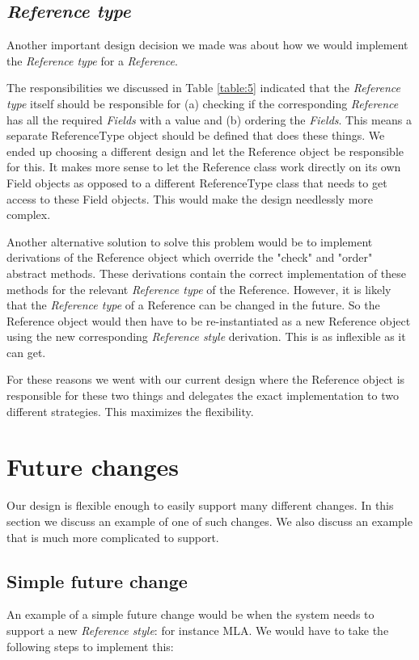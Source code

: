 \documentclass[a4paper]{article}
\begin{document}
\subsection{\textit{Reference type}}
Another important design decision we made was about how we would implement the \textit{Reference type} for a \textit{Reference}. 

The responsibilities we discussed in Table \ref{table:5} indicated that the \textit{Reference type} itself should be responsible for (a) checking if the corresponding \textit{Reference} has all the required \textit{Fields} with a value and (b) ordering the \textit{Fields}. This means a separate ReferenceType object should be defined that does these things. We ended up choosing a different design and let the Reference object be responsible for this. It makes more sense to let the Reference class work directly on its own Field objects as opposed to a different ReferenceType class that needs to get access to these Field objects. This would make the design needlessly more complex.

Another alternative solution to solve this problem would be to implement derivations of the Reference object which override the "check" and "order" abstract methods. These derivations contain the correct implementation of these methods for the relevant \textit{Reference type} of the Reference. However, it is likely that the \textit{Reference type} of a Reference can be changed in the future. So the Reference object would then have to be re-instantiated as a new Reference object using the new corresponding \textit{Reference style} derivation. This is as inflexible as it can get.

For these reasons we went with our current design where the Reference object is responsible for these two things and delegates the exact implementation to two different strategies. This maximizes the flexibility.

\section{Future changes}
Our design is flexible enough to easily support many different changes. In this section we discuss an example of one of such changes. We also discuss an example that is much more complicated to support.

\subsection{Simple future change}
An example of a simple future change would be when the system needs to support a new \textit{Reference style}: for instance MLA. We would have to take the following steps to implement this:
\end{document}
